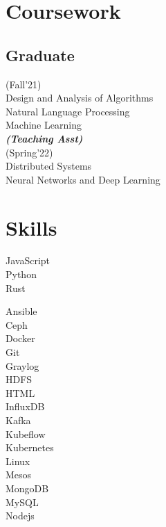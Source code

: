 \documentclass[]{deedy-resume-openfont}
\begin{document}
\begin{minipage}[t]{0.33\textwidth}
\section{Coursework}
\subsection{Graduate}
(Fall'21)\\
\textbullet{} Design and Analysis of Algorithms \\
\textbullet{} Natural Language Processing \\
\textbullet{} Machine Learning \\
{\footnotesize \textit{\textbf{(Teaching Asst) }}}
\\(Spring'22)\\
\textbullet{} Distributed Systems \\
\textbullet{} Neural Networks and Deep Learning \\
\sectionsep


\section{Skills}
\textbullet{} JavaScript \\
\textbullet{} Python \\
\textbullet{} Rust  \\

\textbullet{} Ansible \\
\textbullet{} Ceph \\
\textbullet{} Docker \\
\textbullet{} Git \\
\textbullet{} Graylog \\
\textbullet{} HDFS \\
\textbullet{} HTML \\
\textbullet{} InfluxDB \\
\textbullet{} Kafka \\
\textbullet{} Kubeflow \\
\textbullet{} Kubernetes \\
\textbullet{} Linux \\
\textbullet{} Mesos \\
\textbullet{} MongoDB \\
\textbullet{} MySQL \\
\textbullet{} Nodejs \\
\sectionsep

%
%

\end{minipage} 
\end{document}
